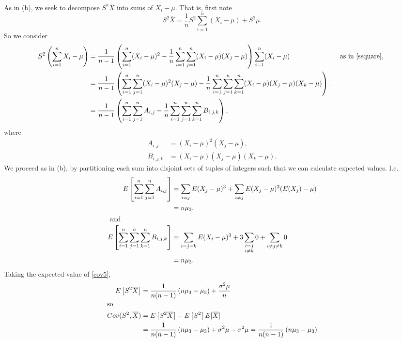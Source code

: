 \documentclass{homework}
\begin{document}
  \begin{solution}
  As in (b), we seek to decompose $S^2 \bar X$ into sums of $X_i - \mu$.  That is, first note
  \begin{equation}  
    S^2 \bar X = \frac 1n S^2 \sum_{i=1}^n (X_i - \mu) + S^2 \mu.
    \label{cov5}
  \end{equation}
  So we consider
  \begin{align*}
    S^2 \left(\sum_{i=1}^n X_i - \mu\right)
    &=\frac 1{n-1} \left( \sum_{i=1}^n (X_i -\mu)^2 - \frac 1n \sum_{i=1}^n\sum_{j=1}^n (X_i - \mu)(X_j - \mu) \right)\sum_{i-1}^n (X_i - \mu) &\text{ as in \eqref{ssquare}, }  \\
    &=\frac 1{n-1} \left( \ssum(X_i -\mu)^2(X_j-\mu) - \frac 1n \sssum(X_i - \mu)(X_j - \mu)(X_k - \mu) \right).\\
    &=\frac 1{n-1} \left( \ssum A_{i,j} - \frac 1n \sssum B_{i,j,k} \right),
  \end{align*}
  where
  \begin{align*}
  A_{i,j} &= (X_i -\mu)^2(X_j-\mu),\\
  B_{i,j,k} &= (X_i - \mu)(X_j - \mu)(X_k - \mu).
  \end{align*} 
  We proceed as in (b), by partitioning each sum into disjoint sets of tuples of integers such that we can calculate expected values.  I.e.
  \begin{align*}
    E\left[\ssum A_{i,j}\right]
    &= \sum_{i=j} E(X_j-\mu)^3 + \sum_{i\not=j} E(X_j-\mu)^2(E(X_j) - \mu)\\
    &= n\mu_3,\\
  \intertext{ and }
    E\left[\sssum B_{i,j,k} \right]
    &= \sum_{i=j=k} E(X_i - \mu)^3 + 3 \sum_{\substack{i=j\\i\not=k}} 0 + \sum_{i\not=j\not=k} 0\\
    &= n \mu_3.
  \end{align*}
  Taking the expected value of \eqref{cov5},
  \begin{align*}
  E\left[S^2 \bar X\right] 
  &= \frac {1}{n(n-1)} \left( n\mu_3  - \mu_3\right) +\frac{\sigma^2 \mu}{n} \\
  \intertext{so}
  Cov(S^2,\bar X)
  &= E\left[S^2 \bar X\right] - E\left[ S^2 \right] E[ \bar X] \\
  &= \frac {1}{n(n-1)} \left( n\mu_3  - \mu_3\right) +\sigma^2 \mu - \sigma^2 \mu = \frac {1}{n(n-1)} \left( n\mu_3  - \mu_3\right)\\
  \end{align*}
  \end{solution}
\end{document}
